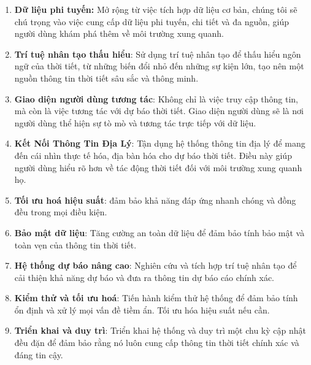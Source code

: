 \begin{enumerate}
    \item \textbf{Dữ liệu phi tuyến:} Mở rộng từ việc tích hợp dữ liệu cơ bản, chúng tôi sẽ chú trọng vào việc cung cấp dữ liệu phi tuyến, chi tiết và đa nguồn, giúp người dùng khám phá thêm về môi trường xung quanh.
    \item \textbf{Trí tuệ nhân tạo thấu hiểu}: Sử dụng trí tuệ nhân tạo để thấu hiểu ngôn ngữ của thời tiết, từ những biến đổi nhỏ đến những sự kiện lớn, tạo nên một nguồn thông tin thời tiết sâu sắc và thông minh.
    \item \textbf{Giao diện người dùng tương tác}: Không chỉ là việc truy cập thông tin, mà còn là việc tương tác với dự báo thời tiết. Giao diện người dùng sẽ là nơi người dùng thể hiện sự tò mò và tương tác trực tiếp với dữ liệu.
    \item \textbf{Kết Nối Thông Tin Địa Lý}: Tận dụng hệ thống thông tin địa lý để mang đến cái nhìn thực tế hóa, địa bàn hóa cho dự báo thời tiết. Điều này giúp người dùng hiểu rõ hơn về tác động thời tiết đối với môi trường xung quanh họ.
    \item \textbf{Tối ưu hoá hiệu suất}: đảm bảo khả năng đáp ứng nhanh chóng và đồng đều trong mọi điều kiện.
    \item \textbf{Bảo mật dữ liệu}: Tăng cường an toàn dữ liệu để đảm bảo tính bảo mật và toàn vẹn của thông tin thời tiết.
    \item \textbf{Hệ thống dự báo nâng cao}: Nghiên cứu và tích hợp trí tuệ nhân tạo để cải thiện khả năng dự báo và đưa ra thông tin dự báo cáo chính xác.
    \item \textbf{Kiểm thử và tối ưu hoá}: Tiến hành kiểm thử hệ thống để đảm bảo tính ổn định và xử lý mọi vấn đề tiềm ẩn. Tối ưu hóa hiệu suất nếu cần.
    \item \textbf{Triển khai và duy trì}: Triển khai hệ thống và duy trì một chu kỳ cập nhật đều đặn để đảm bảo rằng nó luôn cung cấp thông tin thời tiết chính xác và đáng tin cậy.
\end{enumerate}